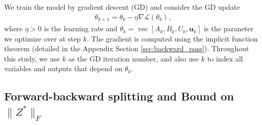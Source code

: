 \documentclass[twoside]{article}
\begin{document}
We train the model by gradient descent (GD)  
and consider the GD update 
\begin{align*}
    \theta_{k + 1}= \theta_k - \eta \nabla \mathcal{L}(\theta_k),
\end{align*}
where $\eta > 0$ is the learning rate and $\theta_k = \operatorname{vec}[A_k, B_k, U_k, \mathbf{u}_k]$ is the paraneter we optimize over at step $k$.
The gradient is computed using the implicit
function theorem (detailed in the Appendix Section \ref{sec:backward_pass}).
Throughout this study, we use $k$ as the GD iteration number, and also use $k$ to index all variables and outputs that depend on $\theta_k$.


\subsection{Forward-backward splitting and Bound on $\|Z^*\|_F$}
\label{sec:forward_backward_splitting}


\end{document}
